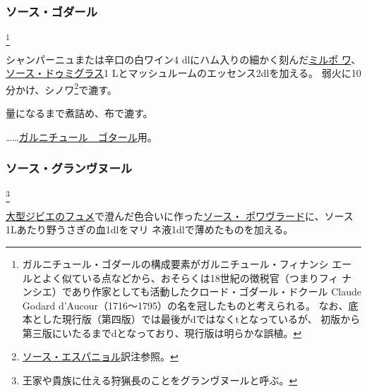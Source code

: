 \begin{recette}
\hypertarget{sauce-godard}{%
\subsubsection{ソース・ゴダール}\label{sauce-godard}}

\footnote{ガルニチュール・ゴダールの構成要素がガルニチュール・フィナンシ
  エールとよく似ている点などから、おそらくは18世紀の徴税官（つまりフィ
  ナンシエ）であり作家としても活動したクロード・ゴダール・ドクール
  Claude Godard d'Aucour（1716〜1795）の名を冠したものと考えられる。
  なお、底本とした現行版（第四版）では最後がdではなくtとなっているが、
  初版から第三版にいたるまでdとなっており、現行版は明らかな誤植。}


シャンパーニュまたは辛口の白ワイン4
dlにハム入りの細かく刻んだ\protect\hyperlink{mirepoix}{ミルポ
ワ}、\protect\hyperlink{sauce-demi-glace}{ソース・ドゥミグラス}1
Lとマッシュルームのエッセンス2dlを加える。
弱火に10分かけ、シノワ\footnote{\protect\hyperlink{sauce-espagnole}{ソース・エスパニョル}訳注参照。}で漉す。

\deuxtiers{}量になるまで煮詰め、布で漉す。

\ldots{}\ldots{}\protect\hyperlink{garniture-godard}{ガルニチュール　ゴタール}用。

\hypertarget{sauce-grand-veneur}{%
\subsubsection{ソース・グランヴヌール}\label{sauce-grand-veneur}}

\footnote{王家や貴族に仕える狩猟長のことをグランヴヌールと呼ぶ。}


\protect\hyperlink{fonds-de-gibier}{大型ジビエのフュメ}で澄んだ色合いに作った\protect\hyperlink{sauce-poivrade}{ソース・
ポワヴラード}に、ソース1Lあたり野うさぎの血1dlをマリ
ネ液1dlで薄めたものを加える。


\end{recette}
